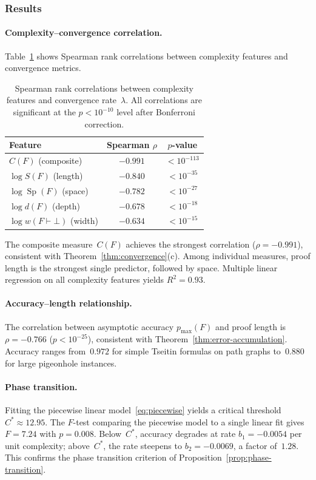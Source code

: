 \subsubsection{Results}

\paragraph{Complexity--convergence correlation.}
Table~\ref{tab:correlations} shows Spearman rank correlations between
complexity features and convergence metrics.

\begin{table}[ht]
\centering
\caption{Spearman rank correlations between complexity features and
convergence rate~$\lambda$.  All correlations are significant at the
$p < 10^{-10}$ level after Bonferroni correction.}\label{tab:correlations}
\begin{tabular}{@{}lcc@{}}
\toprule
\textbf{Feature} & \textbf{Spearman $\rho$} & \textbf{$p$-value} \\
\midrule
$C(F)$ (composite) & $-0.991$ & $< 10^{-113}$ \\
$\log S(F)$ (length) & $-0.840$ & $< 10^{-35}$ \\
$\log \operatorname{Sp}(F)$ (space) & $-0.782$ & $< 10^{-27}$ \\
$\log d(F)$ (depth) & $-0.678$ & $< 10^{-18}$ \\
$\log w(F \vdash \bot)$ (width) & $-0.634$ & $< 10^{-15}$ \\
\bottomrule
\end{tabular}
\end{table}

The composite measure~$C(F)$ achieves the strongest correlation
($\rho = -0.991$), consistent with Theorem~\ref{thm:convergence}(c).  Among
individual measures, proof length is the strongest single predictor, followed
by space.  Multiple linear regression on all complexity features yields
$R^2 = 0.93$.

\paragraph{Accuracy--length relationship.}
The correlation between asymptotic accuracy $p_{\max}(F)$ and proof length is
$\rho = -0.766$ ($p < 10^{-25}$), consistent with
Theorem~\ref{thm:error-accumulation}.  Accuracy ranges from~$0.972$ for simple
Tseitin formulas on path graphs to~$0.880$ for large pigeonhole instances.

\paragraph{Phase transition.}
Fitting the piecewise linear model~\eqref{eq:piecewise} yields a critical
threshold $C^* \approx 12.95$.  The $F$-test comparing the piecewise model to
a single linear fit gives $F = 7.24$ with $p = 0.008$.  Below~$C^*$, accuracy
degrades at rate $b_1 = -0.0054$ per unit complexity; above~$C^*$, the rate
steepens to $b_2 = -0.0069$, a factor of~$1.28$.  This confirms the phase
transition criterion of Proposition~\ref{prop:phase-transition}.

